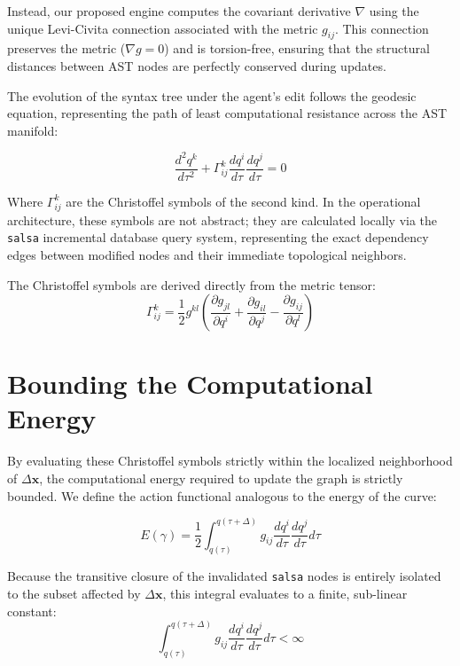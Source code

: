 Instead, our proposed engine computes the covariant derivative $\nabla$ using the unique Levi-Civita connection associated with the metric $g_{ij}$. This connection preserves the metric ($\nabla g = 0$) and is torsion-free, ensuring that the structural distances between AST nodes are perfectly conserved during updates.

The evolution of the syntax tree under the agent's edit follows the geodesic equation, representing the path of least computational resistance across the AST manifold:

\begin{equation}
\frac{d^2 q^k}{d\tau^2} + \Gamma^k_{ij} \frac{dq^i}{d\tau} \frac{dq^j}{d\tau} = 0
\end{equation}

Where $\Gamma^k_{ij}$ are the Christoffel symbols of the second kind. In the operational architecture, these symbols are not abstract; they are calculated locally via the \texttt{salsa} incremental database query system, representing the exact dependency edges between modified nodes and their immediate topological neighbors.

The Christoffel symbols are derived directly from the metric tensor:
\begin{equation}
\Gamma^k_{ij} = \frac{1}{2} g^{kl} \left( \frac{\partial g_{jl}}{\partial q^i} + \frac{\partial g_{il}}{\partial q^j} - \frac{\partial g_{ij}}{\partial q^l} \right)
\end{equation}

\section{Bounding the Computational Energy}

By evaluating these Christoffel symbols strictly within the localized neighborhood of $\Delta \mathbf{x}$, the computational energy required to update the graph is strictly bounded. We define the action functional analogous to the energy of the curve:

\begin{equation}
E(\gamma) = \frac{1}{2} \int_{q(\tau)}^{q(\tau+\Delta)} g_{ij} \frac{dq^i}{d\tau} \frac{dq^j}{d\tau} d\tau
\end{equation}

Because the transitive closure of the invalidated \texttt{salsa} nodes is entirely isolated to the subset affected by $\Delta \mathbf{x}$, this integral evaluates to a finite, sub-linear constant:
\begin{equation}
\int_{q(\tau)}^{q(\tau+\Delta)} g_{ij} \frac{dq^i}{d\tau} \frac{dq^j}{d\tau} d\tau < \infty
\end{equation}

